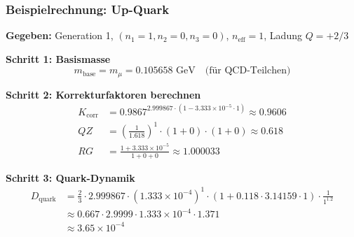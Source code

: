 	\begin{table}[h]
		\centering
		\small
		\caption{Quantenzahlen-Systematik in der fraktalen Methode}
		\label{tab:qn_fractal}
	\end{table}
	
	\subsubsection{Beispielrechnung: Up-Quark}
	
	\textbf{Gegeben:} Generation 1, $(n_1=1, n_2=0, n_3=0)$, $n_{\text{eff}}=1$, Ladung $Q=+2/3$
	
	\textbf{Schritt 1: Basismasse}
	\begin{equation}
		m_{\text{base}} = m_\mu = 0.105658 \text{ GeV} \quad \text{(für QCD-Teilchen)}
	\end{equation}
	
	\textbf{Schritt 2: Korrekturfaktoren berechnen}
	\begin{align}
		K_{\text{corr}} &= 0.9867^{2.999867 \cdot (1 - 3.333 \times 10^{-5} \cdot 1)} \approx 0.9606 \\
		QZ &= \left(\frac{1}{1.618}\right)^1 \cdot (1 + 0) \cdot (1 + 0) \approx 0.618 \\
		RG &= \frac{1 + 3.333 \times 10^{-5}}{1 + 0 + 0} \approx 1.000033
	\end{align}
	
	\textbf{Schritt 3: Quark-Dynamik}
	\begin{align}
		D_{\text{quark}} &= \frac{2}{3} \cdot 2.999867 \cdot (1.333 \times 10^{-4})^1 \cdot (1 + 0.118 \cdot 3.14159 \cdot 1) \cdot \frac{1}{1^{1.2}} \\
		&\approx 0.667 \cdot 2.9999 \cdot 1.333 \times 10^{-4} \cdot 1.371 \\
		&\approx 3.65 \times 10^{-4}
	\end{align}
	
